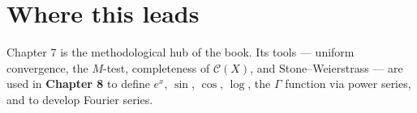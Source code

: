 \documentclass[11pt]{article}
\theoremstyle{definition}
\theoremstyle{plain}
\newcommand{\CX}{\mathscr{C}}      %
\begin{document}
\section*{Where this leads}
Chapter 7 is the methodological hub of the book. Its tools --- uniform
convergence, the $M$-test, completeness of $\CX(X)$, and Stone--Weierstrass ---
are used in \textbf{Chapter 8} to define $e^x$, $\sin$, $\cos$, $\log$, the
$\Gamma$ function via power series, and to develop Fourier series.
\end{document}
